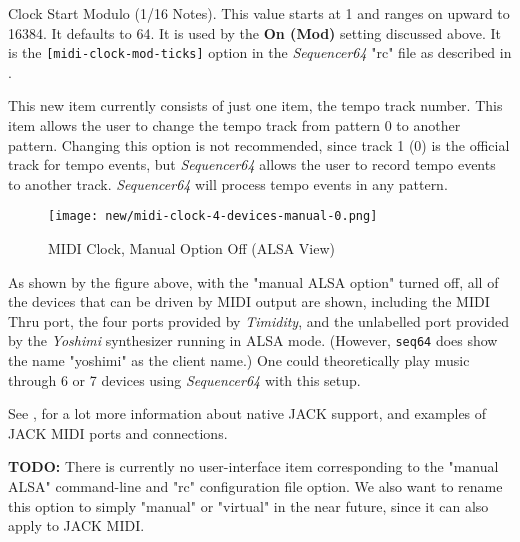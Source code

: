    Clock Start Modulo (1/16 Notes).
   This value starts at 1 and ranges on upward to 16384.
   It  defaults to 64.
   It is used by the \textbf{On (Mod)} setting discussed above.
   It is the \texttt{[midi-clock-mod-ticks]} option in the \textsl{Sequencer64}
   "rc" file as described in
   .

   This new item currently consists of just one item, the tempo track number.
   This item allows the user to change the tempo track from pattern 0 to
   another pattern.  Changing this option is not recommended, since track 1 (0)
   is the official track for tempo events, but \textsl{Sequencer64} allows the
   user to record tempo events to another track.  \textsl{Sequencer64} will
   process tempo events in any pattern.

\begin{figure}[H]
   \centering 
%
   \texttt{[image: new/midi-clock-4-devices-manual-0.png]}
   \caption{MIDI Clock, Manual Option Off (ALSA View)}
   \label{fig:seq64_midi_clock_4_devices_manual_0}
\end{figure}

   As shown by the figure above, with the "manual ALSA option" turned off,
   all of the devices that can be driven by MIDI output are shown,
   including the MIDI Thru port,
   the four ports provided by \textsl{Timidity}, and the unlabelled
   port provided by the \textsl{Yoshimi} synthesizer running in ALSA mode.
   (However, \texttt{seq64} does show the name "yoshimi" as the client name.)
   One could theoretically play music through 6 or 7 devices using
   \textsl{Sequencer64} with this setup.

   See ,
   for a lot more information about native JACK support, and examples of JACK
   MIDI ports and connections.

   \textbf{TODO:}
   There is currently no user-interface item corresponding to the "manual ALSA"
   command-line and "rc" configuration file option.
   We also want to rename this option to simply "manual" or "virtual"
   in the near future, since it can also apply to JACK MIDI.

